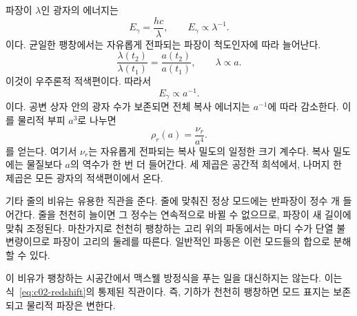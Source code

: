 파장이 \(\lambda\)인 광자의 에너지는
\begin{equation}
E_\gamma=\frac{hc}{\lambda},
\qquad
E_\gamma\propto\lambda^{-1}.
\label{eq:c02-photon-energy}
\end{equation}
이다. 균일한 팽창에서는 자유롭게 전파되는 파장이 척도인자에 따라 늘어난다.
\begin{equation}
\frac{\lambda(t_2)}{\lambda(t_1)}
=\frac{a(t_2)}{a(t_1)},
\qquad
\lambda\propto a.
\label{eq:c02-redshift}
\end{equation}
이것이 우주론적 적색편이다. 따라서
\begin{equation}
E_\gamma\propto a^{-1}.
\label{eq:c02-photon-redshift}
\end{equation}
이다. 공변 상자 안의 광자 수가 보존되면 전체 복사 에너지는 \(a^{-1}\)에 따라 감소한다. 이를 물리적 부피 \(a^3\)로 나누면
\begin{equation}
\boxed{\rho_r(a)=\frac{\nu_r}{a^4}.}
\label{eq:c02-radiation-density}
\end{equation}
를 얻는다. 여기서 \(\nu_r\)는 자유롭게 전파되는 복사 밀도의 일정한 크기 계수다. 복사 밀도에는 물질보다 \(a\)의 역수가 한 번 더 들어간다. 세 제곱은 공간적 희석에서, 나머지 한 제곱은 모든 광자의 적색편이에서 온다.

기타 줄의 비유는 유용한 직관을 준다. 줄에 맞춰진 정상 모드에는 반파장이 정수 개 들어간다. 줄을 천천히 늘이면 그 정수는 연속적으로 바뀔 수 없으므로, 파장이 새 길이에 맞춰 조정된다. 마찬가지로 천천히 팽창하는 고리 위의 파동에서는 마디 수가 단열 불변량이므로 파장이 고리의 둘레를 따른다. 일반적인 파동은 이런 모드들의 합으로 분해할 수 있다.

이 비유가 팽창하는 시공간에서 맥스웰 방정식을 푸는 일을 대신하지는 않는다. 이는 식~\eqref{eq:c02-redshift}의 통제된 직관이다. 즉, 기하가 천천히 팽창하면 모드 표지는 보존되고 물리적 파장은 변한다.

\begin{classroomqa}
\end{classroomqa}

\begin{classroomqa}
\end{classroomqa}

